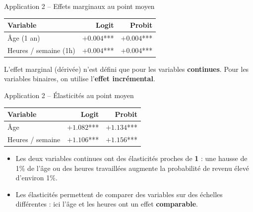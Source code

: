 \documentclass[11pt,aspectratio=169]{beamer}
\begin{document}
\begin{frame}{Application 2 -- Effets marginaux au point moyen}

\begin{center}
    \small
    \renewcommand{\arraystretch}{1.3}
    \begin{tabular}{lrr}
        \toprule
        \textbf{Variable} & \textbf{Logit} & \textbf{Probit} \\
        \midrule
        Âge (1 an) & $+0.004$*** & $+0.004$*** \\
        Heures / semaine (1h) & $+0.004$*** & $+0.004$*** \\
        \bottomrule
    \end{tabular}
\end{center}

L'effet marginal (dérivée) n'est défini que pour les variables
\textbf{continues}. Pour les variables binaires, on utilise l'\textbf{effet
incrémental}.

\end{frame}

\begin{frame}{Application 2 -- Élasticités au point moyen}

\begin{center}
    \small
    \renewcommand{\arraystretch}{1.3}
    \begin{tabular}{lrr}
        \toprule
        \textbf{Variable} & \textbf{Logit} & \textbf{Probit} \\
        \midrule
        Âge & $+1.082$*** & $+1.134$*** \\
        Heures / semaine & $+1.106$*** & $+1.156$*** \\
        \bottomrule
    \end{tabular}
\end{center}

\begin{itemize}

\item Les deux variables continues ont des élasticités proches de
  \textbf{1} : une hausse de 1\% de l'âge ou des heures travaillées
  augmente la probabilité de revenu élevé d'environ 1\%.\newline

\item Les élasticités permettent de comparer des variables sur des
  échelles différentes : ici l'âge et les heures ont un effet
  \textbf{comparable}.

\end{itemize}

\end{frame}
\end{document}
